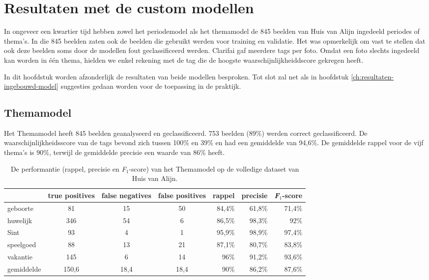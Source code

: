 \chapter{Resultaten met de custom  modellen}
\label{ch:resultaten-custom-model}

In ongeveer een kwartier tijd hebben zowel het periodemodel als het themamodel de 845 beelden van Huis van Alijn ingedeeld periodes of thema’s. In die 845 beelden zaten ook de beelden die gebruikt werden voor training en validatie. Het was opmerkelijk om vast te stellen dat ook deze beelden soms door de modellen fout geclassificeerd werden. Clarifai gaf meerdere tags per foto. Omdat een foto slechts ingedeeld kan worden in één thema, hielden we enkel rekening met de tag die de hoogste waarschijnlijkheiddscore gekregen heeft.

In dit hoofdstuk worden afzonderlijk de resultaten van beide modellen besproken. Tot slot zal net als in hoofdstuk \ref{ch:resultaten-ingebouwd-model} suggesties gedaan worden voor de toepassing in de praktijk.  

\section{Themamodel}
\label{sec:themamodel}

Het Themamodel heeft 845 beelden geanalyseerd en geclassificeerd. 753 beelden (89\%) werden correct geclassificeerd.  De waarschijnlijkheidsscore van de tags bevond zich tussen 100\% en 39\% en had een gemiddelde van 94,6\%. De gemiddelde rappel voor de vijf thema’s is 90\%, terwijl de gemiddelde precisie een waarde van 86\% heeft.

\begin{table}
	\centering
     \renewcommand\arraystretch{1.2}
    \begin{tabular}{l|ccc|rrr}
        \toprule
         & true positives  & false negatives & false positives & rappel & precisie & \textit{F$_{1}$}-score \\
        \midrule
        geboorte & 81 & 15 & 50 & 84,4\% & 61,8\% & 71,4\% \\
        huwelijk & 346 & 54 & 6 & 86,5\% & 98,3\% & 92\% \\
        Sint & 93 & 4 & 1 & 95,9\% & 98,9\% & 97,4\% \\
        speelgoed & 88 & 13 & 21 & 87,1\% & 80,7\% & 83,8\% \\
        vakantie & 145 & 6 & 14 & 96\% & 91,2\% & 93,6\% \\
        \midrule
        gemiddelde & 150,6 & 18,4 & 18,4 & 90\% & 86,2\% & 87,6\% \\
        \bottomrule
    \end{tabular}
    \caption{De performantie (rappel, precisie en \textit{F$_{1}$}-score) van het Themamodel op de volledige dataset van Huis van Alijn.}
    \label{tab:resultaten-themamodel}
\end{table}

